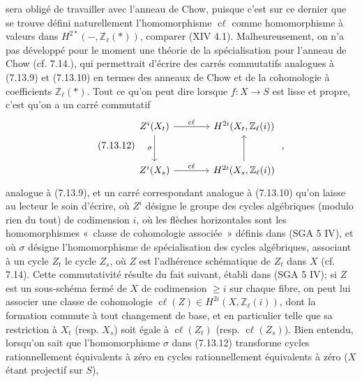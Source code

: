 
sera obligé de travailler avec l'anneau de Chow, puisque c'est sur ce dernier que se trouve défini naturellement l'homomorphisme \(\operatorname{c\ell}\) comme homomorphisme à valeurs dans \(H^{2*}(-,\mathbb Z_\ell(*))\), comparer (XIV 4.1). Malheureusement, on n'a pas développé pour le moment une théorie de la spécialisation pour l'anneau de Chow (cf. 7.14.), qui permettrait d'écrire des carrés commutatifs analogues à (7.13.9) et (7.13.10) en termes des anneaux de Chow et de la cohomologie à coefficients \(\mathbb Z_\ell(*)\). Tout ce qu'on peut dire lorsque \(f:X\to S\) est lisse et propre, c'est qu'on a un carré commutatif
\begin{equation}\tag{7.13.12}
\begin{tikzcd}[column sep=large,row sep=large]
Z^i(X_t) \arrow[r,"\operatorname{c\ell}"] \arrow[d,"\sigma"'] &
H^{2i}(X_t,\mathbb Z_\ell(i))\\
Z^i(X_s) \arrow[r,"\operatorname{c\ell}"] &
H^{2i}(X_s,\mathbb Z_\ell(i)) \arrow[u]
\end{tikzcd}
\;,
\end{equation}
analogue à (7.13.9), et un carré correspondant analogue à (7.13.10) qu'on laisse au lecteur le soin d'écrire, où \(Z^i\) désigne le groupe des cycles algébriques (modulo rien du tout) de codimension \(i\), où les flèches horizontales sont les homomorphismes «~classe de cohomologie associée~» définis dans (SGA 5 IV), et où \(\sigma\) désigne l'homomorphisme de spécialisation des cycles algébriques, associant à un cycle \(Z_t\) le cycle \(Z_s\), où \(Z\) est l'adhérence schématique de \(Z_t\) dans \(X\) (cf. 7.14). Cette commutativité résulte du fait suivant, établi dans (SGA 5 IV); si \(Z\) est un sous-schéma fermé de \(X\) de codimension \(\geq i\) sur chaque fibre, on peut lui associer une classe de cohomologie \(\operatorname{c\ell}(Z)\in H^{2i}(X,\mathbb Z_\ell(i))\), dont la formation commute à tout changement de base, et en particulier telle que sa restriction à \(X_t\) (resp. \(X_s\)) soit égale à \(\operatorname{c\ell}(Z_t)\) (resp. \(\operatorname{c\ell}(Z_s)\)). Bien entendu, lorsqu'on sait que l'homomorphisme \(\sigma\) dans (7.13.12) transforme cycles rationnellement équivalents à zéro en cycles rationnellement équivalents à zéro (\(X\) étant projectif sur \(S\)),
